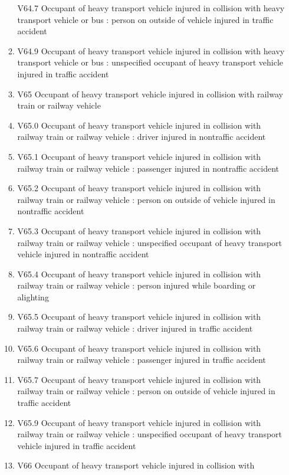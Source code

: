 \documentclass[
]{scrartcl}
\begin{document}
\begin{itemize}
\begin{enumerate}
    V64.7 Occupant of heavy transport vehicle injured in collision with
    heavy transport vehicle or bus : person on outside of vehicle
    injured in traffic accident
  \item
    V64.9 Occupant of heavy transport vehicle injured in collision with
    heavy transport vehicle or bus : unspecified occupant of heavy
    transport vehicle injured in traffic accident
  \item
    V65 Occupant of heavy transport vehicle injured in collision with
    railway train or railway vehicle
  \item
    V65.0 Occupant of heavy transport vehicle injured in collision with
    railway train or railway vehicle : driver injured in nontraffic
    accident
  \item
    V65.1 Occupant of heavy transport vehicle injured in collision with
    railway train or railway vehicle : passenger injured in nontraffic
    accident
  \item
    V65.2 Occupant of heavy transport vehicle injured in collision with
    railway train or railway vehicle : person on outside of vehicle
    injured in nontraffic accident
  \item
    V65.3 Occupant of heavy transport vehicle injured in collision with
    railway train or railway vehicle : unspecified occupant of heavy
    transport vehicle injured in nontraffic accident
  \item
    V65.4 Occupant of heavy transport vehicle injured in collision with
    railway train or railway vehicle : person injured while boarding or
    alighting
  \item
    V65.5 Occupant of heavy transport vehicle injured in collision with
    railway train or railway vehicle : driver injured in traffic
    accident
  \item
    V65.6 Occupant of heavy transport vehicle injured in collision with
    railway train or railway vehicle : passenger injured in traffic
    accident
  \item
    V65.7 Occupant of heavy transport vehicle injured in collision with
    railway train or railway vehicle : person on outside of vehicle
    injured in traffic accident
  \item
    V65.9 Occupant of heavy transport vehicle injured in collision with
    railway train or railway vehicle : unspecified occupant of heavy
    transport vehicle injured in traffic accident
  \item
    V66 Occupant of heavy transport vehicle injured in collision with

\end{enumerate}
\end{itemize}
\end{document}
